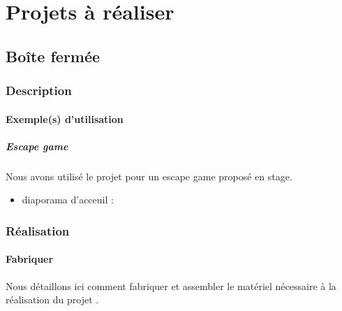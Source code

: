 \documentclass[letterpaper,10pt,french]{sphinxmanual}
\begin{document}
\chapter{Projets à réaliser}
\label{\detokenize{index:projets-a-realiser}}

\section{Boîte fermée}
\label{\detokenize{projets/boite-fermee:boite-fermee}}\label{\detokenize{projets/boite-fermee::doc}}\label{\detokenize{projets/boite-fermee:projetboite}}

\subsection{Description}
\label{\detokenize{projets/boite-fermee:description}}


\subsubsection{Exemple(s) d’utilisation}
\label{\detokenize{projets/boite-fermee:exemple-s-d-utilisation}}

\paragraph{Escape game}
\label{\detokenize{projets/boite-fermee-exemple-escape:escape-game}}\label{\detokenize{projets/boite-fermee-exemple-escape::doc}}
Nous avons utilisé le projet {\hyperref[\detokenize{projets/boite-fermee:projetboite}]{}} pour un escape
game proposé en stage.
\begin{itemize}
\item {} 
diaporama d’acceuil : 

\end{itemize}

\noindent{}


\subsection{Réalisation}
\label{\detokenize{projets/boite-fermee:realisation}}

\subsubsection{Fabriquer}
\label{\detokenize{projets/boite-fermee-fabriquer::doc}}\label{\detokenize{projets/boite-fermee-fabriquer:fabriquer}}
Nous détaillons ici comment fabriquer et assembler
le matériel nécessaire à la réalisation du projet
{\hyperref[\detokenize{projets/boite-fermee:projetboite}]{}}.
\end{document}

